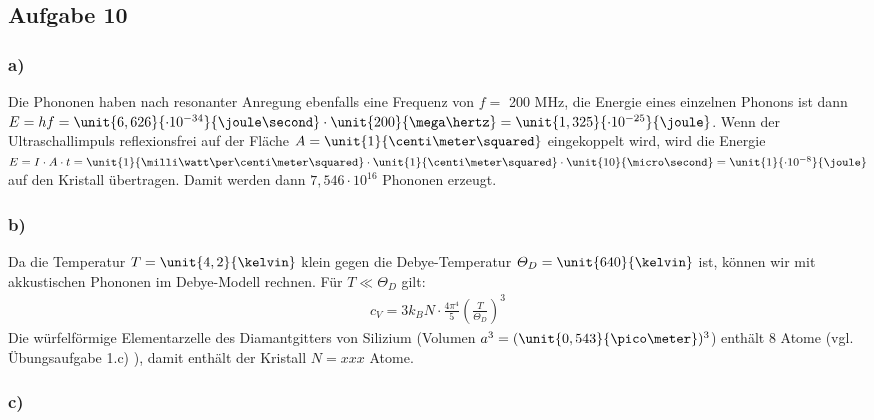 \subsection*{Aufgabe 10}
\subsubsection*{a)}
Die Phononen haben nach resonanter Anregung ebenfalls eine Frequenz von
$f =$ 200 MHz, die Energie eines einzelnen Phonons ist dann $E = h f =
\unit{6,626}{\cdot 10^{-34}}{\joule\second} \cdot \unit{200}{\mega\hertz} =
\unit{1,325}{\cdot 10^{-25}}{\joule}$. Wenn der Ultraschallimpuls reflexionsfrei
auf der Fläche $A = \unit{1}{\centi\meter\squared}$ eingekoppelt wird, wird die
Energie $E = I \cdot A \cdot t = \unit{1}{\milli\watt\per\centi\meter\squared}
\cdot \unit{1}{\centi\meter\squared} \cdot \unit{10}{\micro\second} =
\unit{1}{\cdot 10^{-8}}{\joule}$ auf den Kristall übertragen. Damit werden dann
$7,546 \cdot 10^{16}$ Phononen erzeugt.
\subsubsection*{b)}
Da die Temperatur $T = \unit{4,2}{\kelvin}$ klein gegen die Debye-Temperatur
$\varTheta_D = \unit{640}{\kelvin}$ ist, können wir mit akkustischen Phononen im
Debye-Modell rechnen. Für $T \ll \varTheta_D$ gilt:
\begin{align*}
  c_V = 3 k_B N \cdot \frac{4 \pi^4}{5} \left(\frac{T}{\varTheta_D}\right)^3
\end{align*}
Die würfelförmige Elementarzelle des Diamantgitters von Silizium (Volumen
$a^3 = (\unit{0,543}{\pico\meter})^3$) enthält 8 Atome (vgl. Übungsaufgabe 1.c) ),
damit enthält der Kristall $N = xxx$ Atome.


\subsubsection*{c)}
